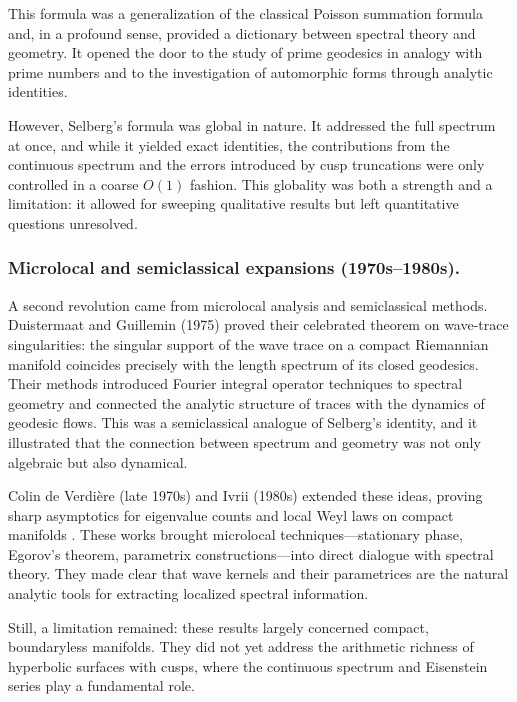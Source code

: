 This formula was a generalization of the classical Poisson summation formula
and, in a profound sense, provided a dictionary between spectral theory and
geometry. It opened the door to the study of prime geodesics in analogy with
prime numbers and to the investigation of automorphic forms through analytic
identities.

However, Selberg’s formula was global in nature. It addressed the full spectrum
at once, and while it yielded exact identities, the contributions from the
continuous spectrum and the errors introduced by cusp truncations were only
controlled in a coarse $O(1)$ fashion. This globality was both a strength and a
limitation: it allowed for sweeping qualitative results but left quantitative
questions unresolved.

\subsubsection*{Microlocal and semiclassical expansions (1970s–1980s).}
A second revolution came from microlocal analysis and semiclassical methods.
Duistermaat and Guillemin (1975) \cite{DG1975} proved their celebrated theorem
on wave-trace singularities: the singular support of the wave trace on a
compact Riemannian manifold coincides precisely with the length spectrum of its
closed geodesics. Their methods introduced Fourier integral operator techniques
to spectral geometry and connected the analytic structure of traces with the
dynamics of geodesic flows. This was a semiclassical analogue of Selberg’s
identity, and it illustrated that the connection between spectrum and geometry
was not only algebraic but also dynamical.

Colin de Verdière (late 1970s) and Ivrii (1980s) extended these ideas, proving
sharp asymptotics for eigenvalue counts and local Weyl laws on compact
manifolds \cite{Colin1978,Ivrii1980}. These works brought microlocal
techniques—stationary phase, Egorov’s theorem, parametrix constructions—into
direct dialogue with spectral theory. They made clear that wave kernels and
their parametrices are the natural analytic tools for extracting localized
spectral information.

Still, a limitation remained: these results largely concerned compact,
boundaryless manifolds. They did not yet address the arithmetic richness of
hyperbolic surfaces with cusps, where the continuous spectrum and Eisenstein
series play a fundamental role.

